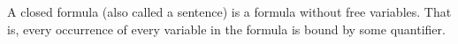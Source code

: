 A closed formula (also called a sentence) is a formula without free variables. That is, every occurrence of every variable in the formula is bound by some quantifier.
